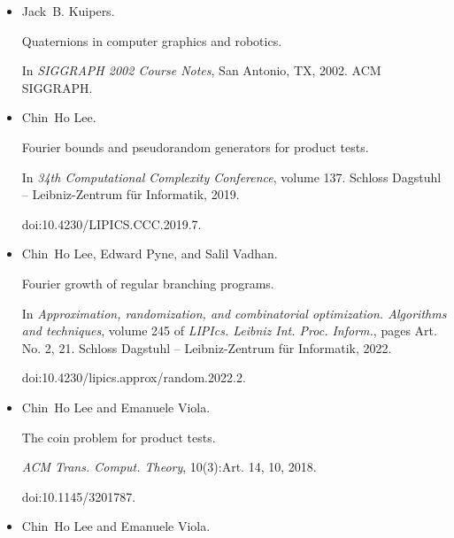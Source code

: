 \begin{itemize}
In \emph{STOC}, pages 263–272. ACM, 2011.


doi:10.1145/1993636.1993672.





\item[] 
[26]

Jack B. Kuipers.


Quaternions in computer graphics and robotics.


In \emph{SIGGRAPH 2002 Course Notes}, San Antonio, TX, 2002. ACM
SIGGRAPH.





\item[] 
[27]

Chin Ho Lee.


Fourier bounds and pseudorandom generators for product tests.


In \emph{34th Computational Complexity Conference}, volume 137.
Schloss Dagstuhl – Leibniz-Zentrum für Informatik, 2019.


doi:10.4230/LIPICS.CCC.2019.7.





\item[] 
[28]

Chin Ho Lee, Edward Pyne, and Salil Vadhan.


Fourier growth of regular branching programs.


In \emph{Approximation, randomization, and combinatorial optimization.
Algorithms and techniques}, volume 245 of \emph{LIPIcs. Leibniz Int. Proc.
Inform.}, pages Art. No. 2, 21. Schloss Dagstuhl – Leibniz-Zentrum für
Informatik, 2022.


doi:10.4230/lipics.approx/random.2022.2.





\item[] 
[29]

Chin Ho Lee and Emanuele Viola.


The coin problem for product tests.


\emph{ACM Trans. Comput. Theory}, 10(3):Art. 14, 10, 2018.


doi:10.1145/3201787.





\item[] 
[30]

Chin Ho Lee and Emanuele Viola.



\end{itemize}
